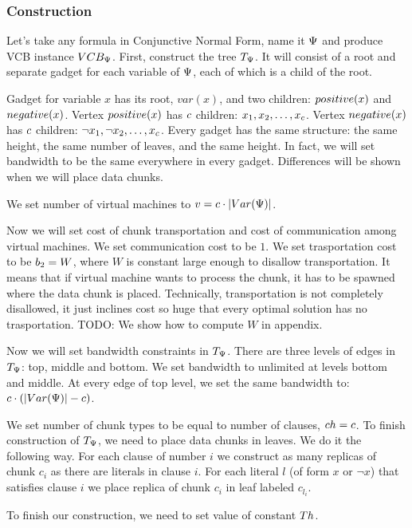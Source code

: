 \subsubsection{Construction}
Let's take any formula in Conjunctive Normal Form, name it $\Psi$ and produce
VCB instance $VCB_{\Psi}$. First, construct the tree $T_{\Psi}$. It will consist of
a root and separate gadget for each variable of $\Psi$, each of which
is a child of the root.


Gadget for variable $x$ has its root, $var(x)$, and two children:
$positive(x)$ and $negative(x)$. Vertex $positive(x)$ has $c$
children: $x_1, x_2, \ldots, x_{c}$. Vertex $negative(x)$ has
$c$ children: $\neg x_1, \neg x_2, \dots, x_{c}$. Every
gadget has the same structure: the same height, the same number of
leaves, and the same height. In fact, we will set bandwidth to be the
same everywhere in every gadget. Differences will be shown when we
will place data chunks.

We set number of virtual machines to $v = c \cdot |Var(\Psi)|$.

Now we will set cost of chunk transportation and cost of communication
among virtual machines. We set communication cost to be $1$. We set
trasportation cost to be $b_2 = W$, where $W$ is constant large enough
to disallow transportation. It means that if virtual machine wants to
process the chunk, it has to be spawned where the data chunk is
placed. Technically, transportation is not completely disallowed, it
just inclines cost so huge that every optimal solution has no
trasportation. TODO: We show how to compute $W$ in appendix.

Now we will set bandwidth constraints in $T_{\Psi}$. There are three
levels of edges in $T_{\Psi}$: top, middle and bottom. We set
bandwidth to unlimited at levels bottom and middle. At every edge of
top level, we set the same bandwidth to: $c \cdot (|Var(\Psi)| -
c)$.

We set number of chunk types to be equal to number of clauses, $ch =
c$. To finish construction of $T_{\Psi}$, we need to place data chunks in
leaves. We do it the following way. For each clause of number $i$ we
construct as many replicas of chunk $c_i$ as there are literals in
clause $i$. For each literal $l$ (of form $x$ or $\neg x$) that satisfies clause $i$ we place
replica of chunk $c_i$ in leaf labeled $c_{l_i}$.

To finish our construction, we need to set value of constant $Th$. 

